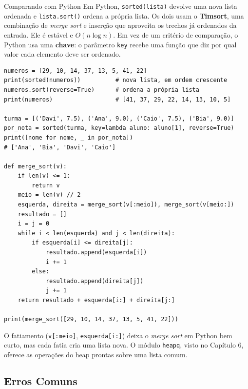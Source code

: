 \begin{destaque}{Comparando com Python}
Em Python, \texttt{sorted(lista)} devolve uma nova lista ordenada e \texttt{lista.sort()} ordena a própria lista. Os dois usam o \textbf{Timsort}, uma combinação de \textit{merge sort} e inserção que aproveita os trechos já ordenados da entrada. Ele é estável e $O(n \log n)$. Em vez de um critério de comparação, o Python usa uma \textbf{chave}: o parâmetro \texttt{key} recebe uma função que diz por qual valor cada elemento deve ser ordenado.

\begin{codigo}
\begin{Verbatim}[breaklines=true, breaksymbolleft={}, fontsize=\footnotesize]
numeros = [29, 10, 14, 37, 13, 5, 41, 22]
print(sorted(numeros))          # nova lista, em ordem crescente
numeros.sort(reverse=True)      # ordena a própria lista
print(numeros)                  # [41, 37, 29, 22, 14, 13, 10, 5]

turma = [('Davi', 7.5), ('Ana', 9.0), ('Caio', 7.5), ('Bia', 9.0)]
por_nota = sorted(turma, key=lambda aluno: aluno[1], reverse=True)
print([nome for nome, _ in por_nota])
# ['Ana', 'Bia', 'Davi', 'Caio']

def merge_sort(v):
    if len(v) <= 1:
        return v
    meio = len(v) // 2
    esquerda, direita = merge_sort(v[:meio]), merge_sort(v[meio:])
    resultado = []
    i = j = 0
    while i < len(esquerda) and j < len(direita):
        if esquerda[i] <= direita[j]:
            resultado.append(esquerda[i])
            i += 1
        else:
            resultado.append(direita[j])
            j += 1
    return resultado + esquerda[i:] + direita[j:]

print(merge_sort([29, 10, 14, 37, 13, 5, 41, 22]))
\end{Verbatim}
\end{codigo}

O fatiamento (\texttt{v[:meio]}, \texttt{esquerda[i:]}) deixa o \textit{merge sort} em Python bem curto, mas cada fatia cria uma lista nova. O módulo \texttt{heapq}, visto no Capítulo 6, oferece as operações do heap prontas sobre uma lista comum.
\end{destaque}

\subsection{Erros Comuns}

